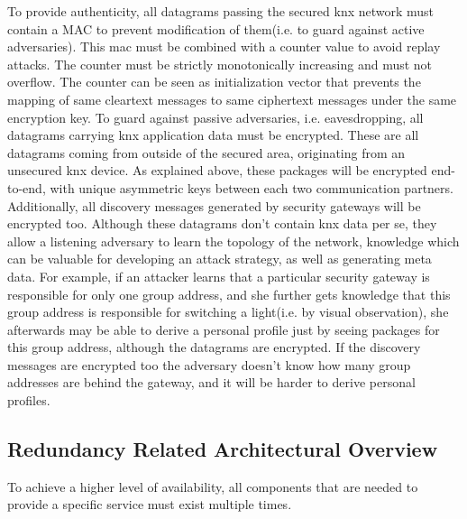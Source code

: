 To provide authenticity, all datagrams passing the secured knx network must contain a MAC to prevent modification of them(i.e. to guard against active
adversaries). This mac must be combined with a counter value to avoid replay attacks. The counter must be strictly monotonically increasing and must not overflow.
The counter can be seen as initialization vector that prevents the mapping of same cleartext messages to same ciphertext messages under the same
encryption key.
To guard against passive adversaries, i.e. eavesdropping, all datagrams carrying knx application data must be encrypted. These are all datagrams coming from outside of the
secured area, originating from an unsecured knx device. As explained above, these packages will be encrypted end-to-end, with unique asymmetric keys between
each two communication partners.
Additionally, all discovery messages generated by security gateways will be encrypted too. Although these datagrams don't contain knx data per se, they allow
a listening adversary to learn the topology of the network, knowledge which can be valuable for developing an attack strategy, as well as generating meta data.
For example, if an attacker learns that a particular security gateway is responsible for only one group address, and she further gets knowledge that this 
group address is responsible for switching a light(i.e. by visual observation), she afterwards may be able to derive a personal profile just by seeing
packages for this group address, although the datagrams are encrypted. If the discovery messages are encrypted too the adversary doesn't know how many
group addresses are behind the gateway, and it will be harder to derive personal profiles.

\subsection{Redundancy Related Architectural Overview}

To achieve a higher level of availability, all components that are needed to provide a specific service must exist multiple times. 
 

